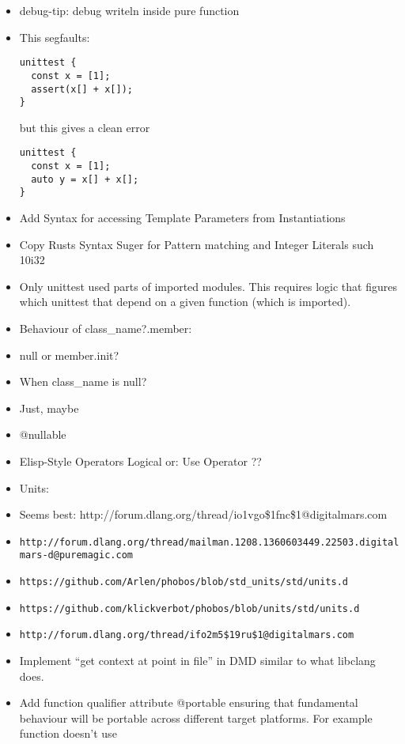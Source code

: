 \documentclass[xcolor=dvipsnames, twocolumn]{article}
\begin{document}
\begin{itemize}

\item debug-tip: debug writeln inside pure function

\item This segfaults:
\begin{lstlisting}[frame=single]
unittest {
  const x = [1];
  assert(x[] + x[]);
}
\end{lstlisting}
but this gives a clean error
\begin{lstlisting}[frame=single]
unittest {
  const x = [1];
  auto y = x[] + x[];
}
\end{lstlisting}

\item Add Syntax for accessing Template Parameters from Instantiations
\item Copy Rusts Syntax Suger for Pattern matching and Integer Literals such 10i32
\item Only unittest used parts of imported modules. This requires logic that
  figures which unittest that depend on a given function (which is imported).
\item Behaviour of class\_name?.member:
\item null or member.init?
\item When class\_name is null?
\item Just, maybe
\item @nullable
\item Elisp-Style Operators Logical or: Use Operator ??
\item Units:
\item Seems best: http://forum.dlang.org/thread/io1vgo\$1fnc\$1@digitalmars.com
\item
  \texttt{http://forum.dlang.org/thread/mailman.1208.1360603449.22503.digitalmars-d@puremagic.com}
\item \texttt{https://github.com/Arlen/phobos/blob/std\_units/std/units.d}
\item \texttt{https://github.com/klickverbot/phobos/blob/units/std/units.d}
\item \texttt{http://forum.dlang.org/thread/ifo2m5\$19ru\$1@digitalmars.com}
\item Implement “get context at point in file” in DMD similar to what libclang
  does.
\item Add function qualifier attribute @portable ensuring that fundamental
  behaviour will be portable across different target platforms. For example
  function doesn't use


\end{itemize}
\end{document}
